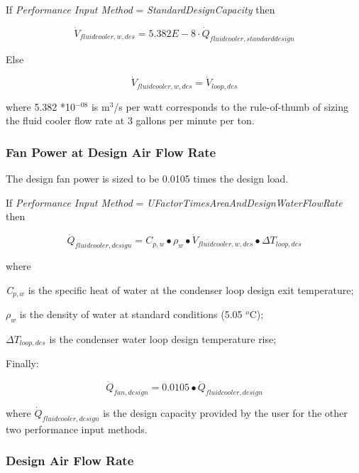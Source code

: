 If \emph{Performance Input Method} = \emph{StandardDesignCapacity} then

\begin{equation}
{\dot V_{fluidcooler,w,des}} = 5.382E - 8\cdot {\dot Q_{fluidcooler,standarddesign}}
\end{equation}

Else

\begin{equation}
{\dot V_{fluidcooler,w,des}} = {\dot V_{loop,des}}
\end{equation}

where 5.382 *10\(^{-08}\) is m\(^{3}\)/s per watt corresponds to the rule-of-thumb of sizing the fluid cooler flow rate at 3 gallons per minute per ton.

\subsubsection{Fan Power at Design Air Flow Rate}\label{fan-power-at-design-air-flow-rate-2}

The design fan power is sized to be 0.0105 times the design load.

If \emph{Performance Input Method} = \emph{UFactorTimesAreaAndDesignWaterFlowRate} then

\begin{equation}
{\dot Q_{fluidcooler,design}} = {C_{p,w}} \bullet {\rho_w} \bullet {\dot V_{fluidcooler,w,des}} \bullet \Delta {T_{loop,des}}
\end{equation}

where

\emph{C\(_{p,w}\)} is the specific heat of water at the condenser loop design exit temperature;

\emph{\(\rho_{w}\)} is the density of water at standard conditions (5.05 \(^{o}\)C);

\emph{\(\Delta T_{loop,des}\)} is the condenser water loop design temperature rise;

Finally:

\begin{equation}
{\dot Q_{fan,design}} = 0.0105 \bullet {\dot Q_{fluidcooler,design}}
\end{equation}

where \({\dot Q_{fluidcooler,design}}\) is the design capacity provided by the user for the other two performance input methods.

\subsubsection{Design Air Flow Rate}\label{design-air-flow-rate-2}

